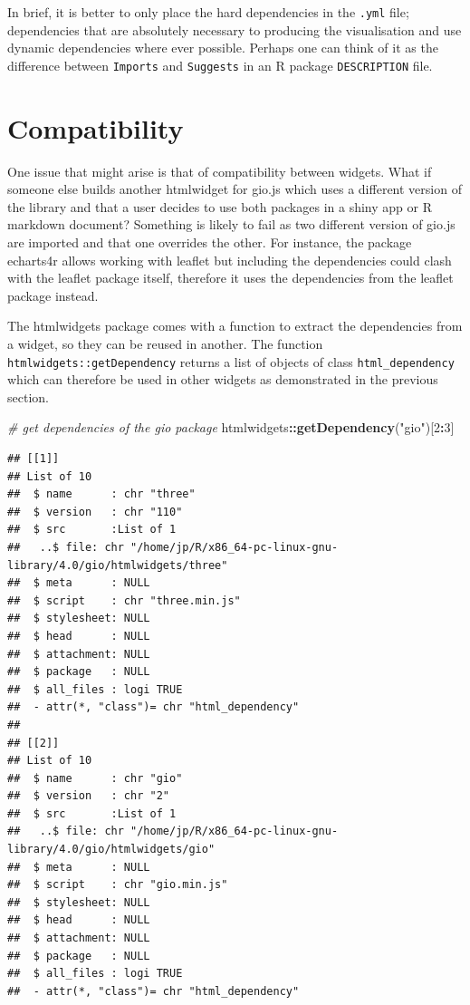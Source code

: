 \documentclass[
]{krantz}
\makeatletter
\newenvironment{Shaded}{\begin{snugshade}}{\end{snugshade}}
\newcommand{\CommentTok}[1]{\textcolor[rgb]{0.37,0.37,0.37}{\textit{#1}}}
\newcommand{\DecValTok}[1]{\textcolor[rgb]{0.06,0.06,0.06}{#1}}
\newcommand{\KeywordTok}[1]{\textcolor[rgb]{0.27,0.27,0.27}{\textbf{#1}}}
\newcommand{\NormalTok}[1]{#1}
\newcommand{\OperatorTok}[1]{\textcolor[rgb]{0.43,0.43,0.43}{\textbf{#1}}}
\newcommand{\StringTok}[1]{\textcolor[rgb]{0.5,0.5,0.5}{#1}}
\newenvironment{kframe}{%
\medskip{}
\setlength{\fboxsep}{.8em}
 \def\at@end@of@kframe{}%
 \ifinner\ifhmode%
  \def\at@end@of@kframe{\end{minipage}}%
  \begin{minipage}{\columnwidth}%
 \fi\fi%
 \def\FrameCommand##1{\hskip\@totalleftmargin \hskip-\fboxsep
 \colorbox{shadecolor}{##1}\hskip-\fboxsep
     \hskip-\linewidth \hskip-\@totalleftmargin \hskip\columnwidth}%
 \MakeFramed {\advance\hsize-\width
   \@totalleftmargin\z@ \linewidth\hsize
   \@setminipage}}%
 {\par\unskip\endMakeFramed%
 \at@end@of@kframe}
\renewenvironment{Shaded}{\begin{kframe}}{\end{kframe}}
\makeatother
\begin{document}
In brief, it is better to only place the hard dependencies in the \texttt{.yml} file; dependencies that are absolutely necessary to producing the visualisation and use dynamic dependencies where ever possible. Perhaps one can think of it as the difference between \texttt{Imports} and \texttt{Suggests} in an R package \texttt{DESCRIPTION} file.

\hypertarget{widgets-adv-compatibility}{%
\section{Compatibility}\label{widgets-adv-compatibility}}

One issue that might arise is that of compatibility between widgets. What if someone else builds another htmlwidget for gio.js which uses a different version of the library and that a user decides to use both packages in a shiny app or R markdown document? Something is likely to fail as two different version of gio.js are imported and that one overrides the other. For instance, the package echarts4r \citep{R-echarts4r} allows working with leaflet but including the dependencies could clash with the leaflet package itself, therefore it uses the dependencies from the leaflet package instead.

The htmlwidgets package comes with a function to extract the dependencies from a widget, so they can be reused in another. The function \texttt{htmlwidgets::getDependency} returns a list of objects of class \texttt{html\_dependency} which can therefore be used in other widgets as demonstrated in the previous section.

\begin{Shaded}
\begin{Highlighting}[]
\CommentTok{\# get dependencies of the gio package}
\NormalTok{htmlwidgets}\OperatorTok{::}\KeywordTok{getDependency}\NormalTok{(}\StringTok{"gio"}\NormalTok{)[}\DecValTok{2}\OperatorTok{:}\DecValTok{3}\NormalTok{]}
\end{Highlighting}
\end{Shaded}

\begin{verbatim}
## [[1]]
## List of 10
##  $ name      : chr "three"
##  $ version   : chr "110"
##  $ src       :List of 1
##   ..$ file: chr "/home/jp/R/x86_64-pc-linux-gnu-library/4.0/gio/htmlwidgets/three"
##  $ meta      : NULL
##  $ script    : chr "three.min.js"
##  $ stylesheet: NULL
##  $ head      : NULL
##  $ attachment: NULL
##  $ package   : NULL
##  $ all_files : logi TRUE
##  - attr(*, "class")= chr "html_dependency"
## 
## [[2]]
## List of 10
##  $ name      : chr "gio"
##  $ version   : chr "2"
##  $ src       :List of 1
##   ..$ file: chr "/home/jp/R/x86_64-pc-linux-gnu-library/4.0/gio/htmlwidgets/gio"
##  $ meta      : NULL
##  $ script    : chr "gio.min.js"
##  $ stylesheet: NULL
##  $ head      : NULL
##  $ attachment: NULL
##  $ package   : NULL
##  $ all_files : logi TRUE
##  - attr(*, "class")= chr "html_dependency"
\end{verbatim}
\end{document}
